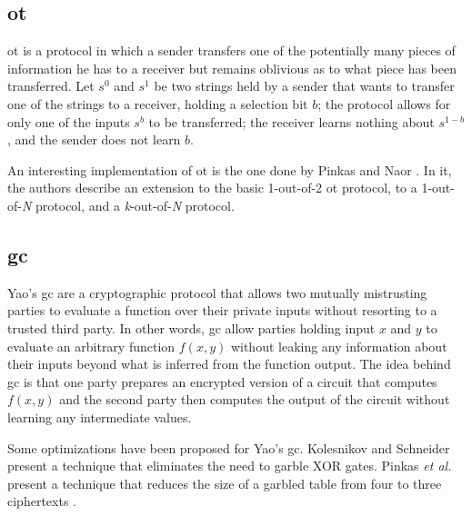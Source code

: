 \subsection{\acl{ot}}
\label{ssec:ObliviousTransfer}


\acf{ot} \cite{rabin2005exchange} is a protocol in which a sender transfers one of the potentially many pieces of information he has to a receiver but remains oblivious as to what piece has been transferred. Let $s^0$ and $s^1$ be two strings held by a sender that wants to transfer one of the strings to a receiver, holding a selection bit $b$; the protocol allows for only one of the inputs $s^b$ to be transferred; the receiver learns nothing about $s^{1-b}$, and the sender does not learn $b$. 

An interesting implementation of \ac{ot} is the one done by Pinkas and Naor \cite{naor2005computationally}. In it, the authors describe an extension to the basic 1-out-of-2 \ac{ot} protocol, to a 1-out-of-\textit{N} protocol, and a \textit{k}-out-of-\textit{N} protocol.


\subsection{\acl{gc}} 
\label{ssec:GarbledCircuits}


Yao's \acf{gc} \cite{yao1986generate} are a cryptographic protocol that allows two mutually mistrusting parties to evaluate a function over their private inputs without resorting to a trusted third party. In other words, \ac{gc} allow parties holding input $x$ and $y$ to evaluate an arbitrary function $f(x,y)$ without leaking any information about their inputs beyond what is inferred from the function output. The idea behind \ac{gc} is that one party prepares an encrypted version of a circuit that computes $f(x,y)$ and the second party then computes the output of the circuit without learning any intermediate values.

Some optimizations have been proposed for Yao's \ac{gc}. Kolesnikov and Schneider \cite{kolesnikov2008improved} present a technique that eliminates the need to garble XOR gates. Pinkas \textit{et al.} present a technique that reduces the size of a garbled table from four to three ciphertexts \cite{pinkas2009secure}.


